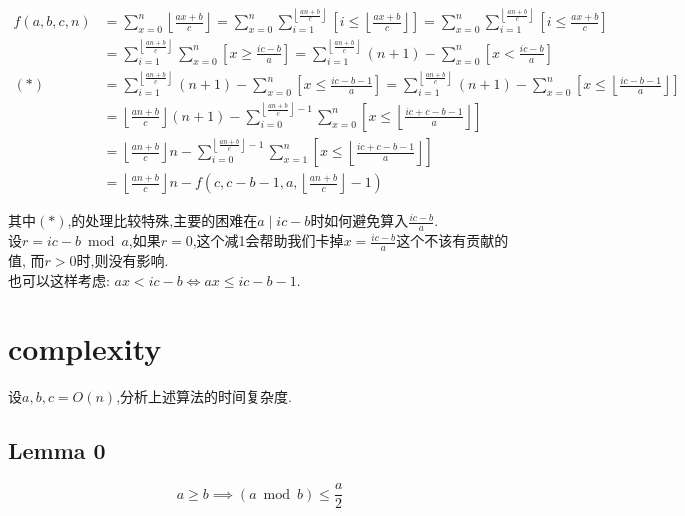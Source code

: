 \documentclass{article}
\begin{document}
\[
	\begin{aligned}
		f(a,b,c,n)
			&=\sum_{x=0}^n \left\lfloor\frac{ax+b}{c}\right\rfloor
			 =\sum_{x=0}^n \sum_{i=1}^{\left\lfloor\frac{an+b}{c}\right\rfloor}
			 	\left[ i \leq \left\lfloor\frac{ax+b}{c}\right\rfloor \right]
			 =\sum_{x=0}^n \sum_{i=1}^{\left\lfloor\frac{an+b}{c}\right\rfloor}
			 	\left[ i \leq \frac{ax+b}{c} \right]\\
			&=\sum_{i=1}^{\left\lfloor\frac{an+b}{c}\right\rfloor}
					\sum_{x=0}^n \left[ x\geq \frac{ic-b}{a} \right]
			=\sum_{i=1}^{\left\lfloor\frac{an+b}{c}\right\rfloor}
					(n+1)-\sum_{x=0}^n \left[ x < \frac{ic-b}{a}\right]\\
	(*) &=\sum_{i=1}^{\left\lfloor\frac{an+b}{c}\right\rfloor}
					(n+1)-\sum_{x=0}^n \left[ x \leq \frac{ic-b-1}{a}\right]
			 =\sum_{i=1}^{\left\lfloor\frac{an+b}{c}\right\rfloor}
					(n+1)-\sum_{x=0}^n \left[ x \leq \left\lfloor\frac{ic-b-1}{a}\right\rfloor\right]\\
			&={\left\lfloor\frac{an+b}{c}\right\rfloor}(n+1)
				-\sum_{i=0}^{{\left\lfloor\frac{an+b}{c}\right\rfloor}- 1}
				\sum_{x=0}^n \left[ x \leq \left\lfloor\frac{ic+c-b-1}{a}\right\rfloor\right]\\
			&={\left\lfloor\frac{an+b}{c}\right\rfloor}n
				-\sum_{i=0}^{{\left\lfloor\frac{an+b}{c}\right\rfloor}- 1}
				\sum_{x=1}^n \left[ x \leq \left\lfloor\frac{ic+c-b-1}{a}\right\rfloor\right]\\
			&={\left\lfloor\frac{an+b}{c}\right\rfloor}n-f\left(c,c-b-1,a,\left\lfloor\frac{an+b}{c}\right\rfloor -1\right)
	\end{aligned}
\]

其中$(\ast)$,的处理比较特殊,主要的困难在$a\mid ic-b$时如何避免算入$\frac{ic-b}{a}$.\\
设$r=ic-b\bmod a$,如果$r=0$,这个减1会帮助我们卡掉$x=\frac{ic-b}{a}$这个不该有贡献的值, 而$r>0$时,则没有影响.\\
也可以这样考虑: $ax < ic-b\iff ax \leq ic-b-1$.


\section{complexity}

设$a,b,c=O(n)$,分析上述算法的时间复杂度.

\subsection*{Lemma 0}

\[ a\geq b \implies (a\bmod b) \leq \frac{a}{2} \]
\end{document}
